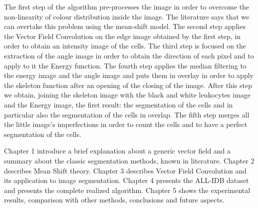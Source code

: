 \bigskip


The first step of the algorithm pre-processes the image in order to overcome the non-linearity  of colour distribution inside the image. The literature says that we can overtake this problem using the mean-shift model. The second step applies the Vector Field Convolution on the edge image obtained by the first step, in order to obtain an intensity image of the cells. The third step is focused on the extraction of the angle image in order to obtain the direction of each pixel and to apply to it the Energy function. The fourth step applies the median filtering to the energy image and the angle image and puts them in overlay in order to apply the skeleton function after an opening of the closing of the image. After this step we obtain, joining the skeleton image with the black and white leukocytes image and the Energy image, the first result: the segmentation of the cells and in particular also the segmentation of the cells in overlap.
The fifth step merges all the little image's imperfections in order to count the cells and to have a perfect segmentation of the cells.


\bigskip

Chapter 1 introduce a brief explanation about a generic vector field and a summary about the classic segmentation methods, known in literature. Chapter 2 describes Mean Shift theory. Chapter 3 describes Vector Field Convolution and its application to image segmentation. Chapter 4 presents the ALL-IDB dataset and presents the complete realized algorithm. Chapter 5 shows the experimental results, comparison with other methods, conclusions and future aspects.